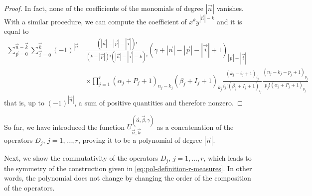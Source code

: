 \documentclass[11pt,reqno]{amsart}
\theoremstyle{definition}
\begin{document}
\begin{proof}
    In fact, none of the coefficients of the monomials of degree $|\vec n|$ vanishes. With a similar procedure, we can compute the coefficient of $x^k y^{|\vec n|-k}$ and it is equal to 
    $$
    \begin{aligned}
    \sum_{\vec p=0}^{\vec n-\vec k}\sum_{\vec i=0}^{\vec k} (-1)^{|\vec n|} & \frac{(|\vec n|-|\vec p|-|\vec i|)!}{(k-|\vec p|)!(|\vec n|-|\vec i|-k)!} (\gamma+|\vec n|-|\vec p|-|\vec i|+1)_{|\vec p|+|\vec i|}
    \\
    &\times \prod_{j=1}^r (\alpha_j+P_j+1)_{n_j-k_j}(\beta_j+I_j+1)_{k_j} \frac{(k_j-i_j+1)_{i_j}}{i_j! (\beta_j+I_j+1)_{i_j}}
    \frac{(n_j-k_j-p_j+1)_{p_j}}{p_j! (\alpha_j+P_j+1)_{p_j}}
    \end{aligned}
    $$
    that is, up to $(-1)^{|\vec n|}$, a sum of positive quantities and therefore nonzero. 
\end{proof}

So far, we have introduced the function $U_{\vec n,\vec k}^{(\vec\alpha,\vec\beta,\gamma)}$ as a concatenation of the operators $D_j$, $j=1,\dots, r$, proving it to be a polynomial of degree $|\vec n|$. 

Next, we show the commutativity of the operators $D_j$, $j=1,\dots, r$, which leads to the symmetry of the construction given in \eqref{eq:pol-definition-r-measures}. In other words, the polynomial does not change by changing the order of the composition of the operators.
\end{document}
